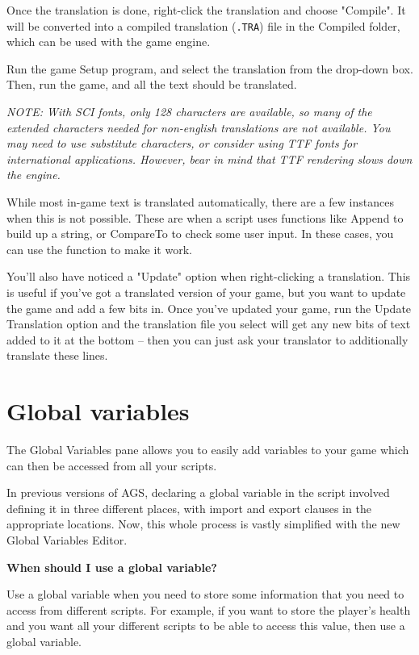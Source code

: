 Once the translation is done, right-click the translation and choose "Compile".
It will be converted into a compiled translation (\verb$.TRA$) file in the
Compiled folder, which can be used with the game engine.

Run the game Setup program, and select the translation from the drop-down box.
Then, run the game, and all the text should be translated.

\it{NOTE: With SCI fonts, only 128 characters are available, so many of the extended
characters needed for non-english translations are not available. You may need to use
substitute characters, or consider using TTF fonts for international applications. However,
bear in mind that TTF rendering slows down the engine.}

While most in-game text is translated automatically, there are a few instances when
this is not possible. These are when a script uses functions like Append to build
up a string, or CompareTo to check some user input. In these cases, you can use the
 function to make it work.

You'll also have noticed a "Update" option when right-clicking a translation. This is useful if you've
got a translated version of your game, but you want to update the game and add a few bits in.
Once you've updated your game, run the Update Translation option and the translation file
you select will get any new bits of text added to it at the bottom -- then you can just ask
your translator to additionally translate these lines.


\section{Global variables}\label{GlobalVariables}%

The Global Variables pane allows you to easily add variables to your game which
can then be accessed from all your scripts.

In previous versions of AGS, declaring a global variable in the script involved
defining it in three different places, with import and export clauses in the
appropriate locations. Now, this whole process is vastly simplified with the new
Global Variables Editor.

\bf{When should I use a global variable?}

Use a global variable when you need to store some information that you need
to access from different scripts. For example, if you want to store the player's
health and you want all your different scripts to be able to access this value,
then use a global variable.

